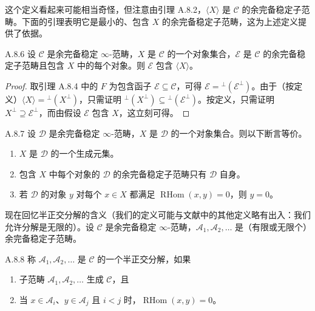 这个定义看起来可能相当奇怪，但注意由引理 A.8.2，$\langle X\rangle$ 是 $\mathcal C$ 的余完备稳定子范畴。下面的引理表明它是最小的、包含 $X$ 的余完备稳定子范畴，这为上述定义提供了依据。

\begin{lem}{A.8.6}\label{thm:a4-18-7}
设 $\mathcal C$ 是余完备稳定 $\infty$-范畴，$X$ 是 $\mathcal C$ 的一个对象集合，$\mathcal E$ 是 $\mathcal C$ 的余完备稳定子范畴且包含 $X$ 中的每个对象。则 $\mathcal E$ 包含 $\langle X\rangle$。
\end{lem}
\begin{proof}
取引理 A.8.4 中的 $F$ 为包含函子 $\mathcal E\subseteq\mathcal C$，可得 $\mathcal E={}^{\perp}(\mathcal E^{\perp})$。由于（按定义）$\langle X\rangle={}^{\perp}(X^{\perp})$，只需证明 ${}^{\perp}(X^{\perp})\subseteq{}^{\perp}(\mathcal E^{\perp})$。按定义，只需证明 $X^{\perp}\supseteq\mathcal E^{\perp}$，而由假设 $\mathcal E$ 包含 $X$，这立刻可得。
\end{proof}

\begin{cor}{A.8.7}\label{thm:a4-18-8}
设 $\mathcal D$ 是余完备稳定 $\infty$-范畴，$X$ 是 $\mathcal D$ 的一个对象集合。则以下断言等价。
\begin{enumerate}[label=(\arabic*),leftmargin=2.4em,itemsep=0.15em]
\item $X$ 是 $\mathcal D$ 的一个生成元集。
\item 包含 $X$ 中每个对象的 $\mathcal D$ 的余完备稳定子范畴只有 $\mathcal D$ 自身。
\item 若 $\mathcal D$ 的对象 $y$ 对每个 $x\in X$ 都满足 $\operatorname{RHom}(x,y)=0$，则 $y=0$。
\end{enumerate}
\end{cor}

现在回忆半正交分解的含义（我们的定义可能与文献中的其他定义略有出入：我们允许分解是无限的）。设 $\mathcal C$ 是余完备稳定 $\infty$-范畴，$\mathcal A_1,\mathcal A_2,\dots$ 是（有限或无限个）余完备稳定子范畴。

\begin{defn}{A.8.8}\label{thm:a4-18-9}
称 $\mathcal A_1,\mathcal A_2,\dots$ 是 $\mathcal C$ 的一个半正交分解，如果
\begin{enumerate}[label=(\arabic*),leftmargin=2.4em,itemsep=0.15em]
\item 子范畴 $\mathcal A_1,\mathcal A_2,\dots$ 生成 $\mathcal C$，且
\item 当 $x\in\mathcal A_i$、$y\in\mathcal A_j$ 且 $i<j$ 时，$\operatorname{RHom}(x,y)=0$。
\end{enumerate}
\end{defn}

